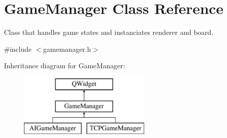 \hypertarget{class_game_manager}{\section{Game\-Manager Class Reference}
\label{class_game_manager}
}


Class that handles game states and instanciates renderer and board.  




{\ttfamily \#include $<$gamemanager.\-h$>$}

Inheritance diagram for Game\-Manager\-:\begin{figure}[H]
\begin{center}
\leavevmode
\includegraphics[height=3.000000cm]{class_game_manager}
\end{center}
\end{figure}

